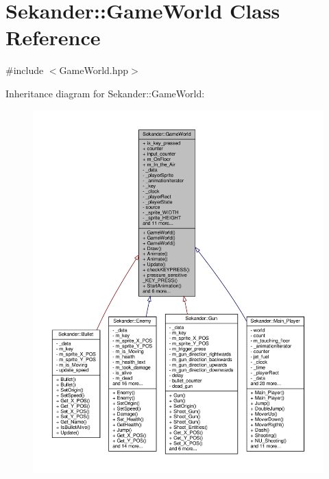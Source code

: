 \hypertarget{classSekander_1_1GameWorld}{}\section{Sekander\+:\+:Game\+World Class Reference}
\label{classSekander_1_1GameWorld}


{\ttfamily \#include $<$Game\+World.\+hpp$>$}



Inheritance diagram for Sekander\+:\+:Game\+World\+:
\nopagebreak
\begin{figure}[H]
\begin{center}
\leavevmode
\includegraphics[width=350pt]{classSekander_1_1GameWorld__inherit__graph}
\end{center}
\end{figure}


